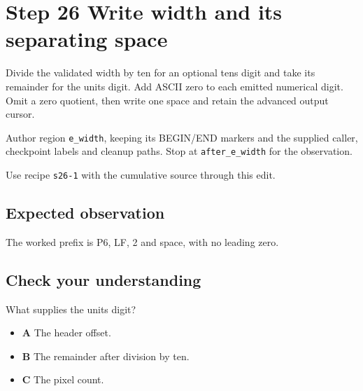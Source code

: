 \section{Step 26 Write width and its separating space}\label{ppm-s26}

Divide the validated width by ten for an optional tens digit and take its remainder for the units digit. Add ASCII zero to each emitted numerical digit. Omit a zero quotient, then write one space and retain the advanced output cursor.

Author region \texttt{e\_width}, keeping its BEGIN/END markers and the supplied caller, checkpoint labels and cleanup paths. Stop at \texttt{after\_e\_width} for the observation.

Use recipe \texttt{s26-1} with the cumulative source through this edit.

\subsection{Expected observation}
The worked prefix is P6, LF, 2 and space, with no leading zero.

\subsection{Check your understanding}
What supplies the units digit?

\begin{itemize}
\item \textbf{A} The header offset.
\item \textbf{B} The remainder after division by ten.
\item \textbf{C} The pixel count.
\end{itemize}
